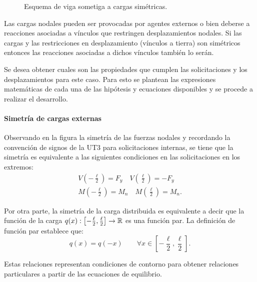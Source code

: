 \begin{figure}[htb]
\centering
\def\svgwidth{0.9\textwidth}

\caption{Esquema de viga sometiga a cargas simétricas.}
\label{fig:vigsim}
\end{figure}

Las cargas nodales pueden ser provocadas por agentes externos o bien deberse a reacciones asociadas a vínculos que restringen desplazamientos nodales. %
%
Si las cargas y las restricciones en desplazamiento (vínculos a tierra) son simétricos entonces las reacciones asociadas a dichos vínculos también lo serán. %

Se desea obtener cuales son las propiedades que cumplen las solicitaciones y los desplazamientos para este caso. %
%
Para esto se plantean las expresiones matemáticas de cada una de las hipótesis y ecuaciones disponibles y se procede a realizar el desarrollo.

\paragraph{Simetría de cargas externas}
%
Observando en la figura la simetría de las fuerzas nodales y recordando la convención de signos de la UT3 para solicitaciones internas, se tiene que la simetría es equivalente a las siguientes condiciones en las solicitaciones en los extremos:
%
\begin{eqnarray}
V \left(-\frac{\ell}{2}\right) = F_y \quad 
V\left( \frac{\ell}{2}\right) = -F_y \\
M\left( -\frac{\ell}{2}\right) = M_n \quad
M\left( \frac{\ell}{2} \right) = M_n.
\end{eqnarray}
%

Por otra parte, la simetría de la carga distribuida es equivalente a decir que la función de la carga $q(x):\left[-\frac{\ell}{2},\frac{\ell}{2} \right] \rightarrow {\mathbb R}$ es una función par. %
%
La definición de función par establece que:
\begin{equation}
q( x) = q(-x) \qquad \forall x \in \left[-\frac{\ell}{2},\frac{\ell}{2} \right].
\end{equation}

Estas relaciones representan condiciones de contorno para obtener relaciones particulares a partir de las ecuaciones de equilibrio.

